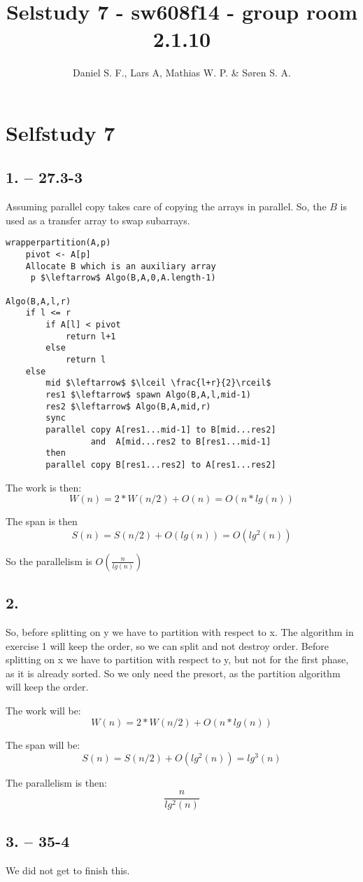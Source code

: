 \documentclass[12pt,a4paper]{report}
\title{Selstudy 7 - sw608f14 - group room 2.1.10}
\author{Daniel S. F., Lars A, Mathias W. P. \& Søren S. A.}
\begin{document}
\maketitle
\chapter*{Selfstudy 7}
\section*{1. -- 27.3-3}
Assuming parallel copy takes care of copying the arrays in parallel.
So, the $B$ is used as a transfer array to swap subarrays.

\begin{lstlisting}
wrapperpartition(A,p)
	pivot <- A[p]
	Allocate B which is an auxiliary array
     p $\leftarrow$ Algo(B,A,0,A.length-1)
     
Algo(B,A,l,r)
	if l <= r
		if A[l] < pivot
			return l+1
		else
			return l
	else
		mid $\leftarrow$ $\lceil \frac{l+r}{2}\rceil$
		res1 $\leftarrow$ spawn Algo(B,A,l,mid-1)
		res2 $\leftarrow$ Algo(B,A,mid,r)
		sync
		parallel copy A[res1...mid-1] to B[mid...res2]
			     and  A[mid...res2 to B[res1...mid-1]
		then 
		parallel copy B[res1...res2] to A[res1...res2]
\end{lstlisting}

The work is then:
$$W(n) = 2*W(n/2) + O(n) = O(n*lg(n))$$

The span is then
$$S(n) = S(n/2) + O(lg(n)) = O(lg^2(n))$$

So the parallelism is $O(\frac{n}{lg(n)})$

\section*{2.}
So, before splitting on y we have to partition with respect to x.
The algorithm in exercise 1 will keep the order, so we can split and not destroy order.
Before splitting on x we have to partition with respect to y, but not for the first phase, as it is already sorted.
So we only need the presort, as the partition algorithm will keep the order.

The work will be:
$$W(n) = 2* W(n/2) + O(n*lg(n))$$

The span will be:
$$S(n) = S(n/2) + O(lg^2(n)) = lg^3(n)$$

The parallelism is then:
$$\frac{n}{lg^2(n)}$$

\section*{3. -- 35-4}
We did not get to finish this.
\end{document}

